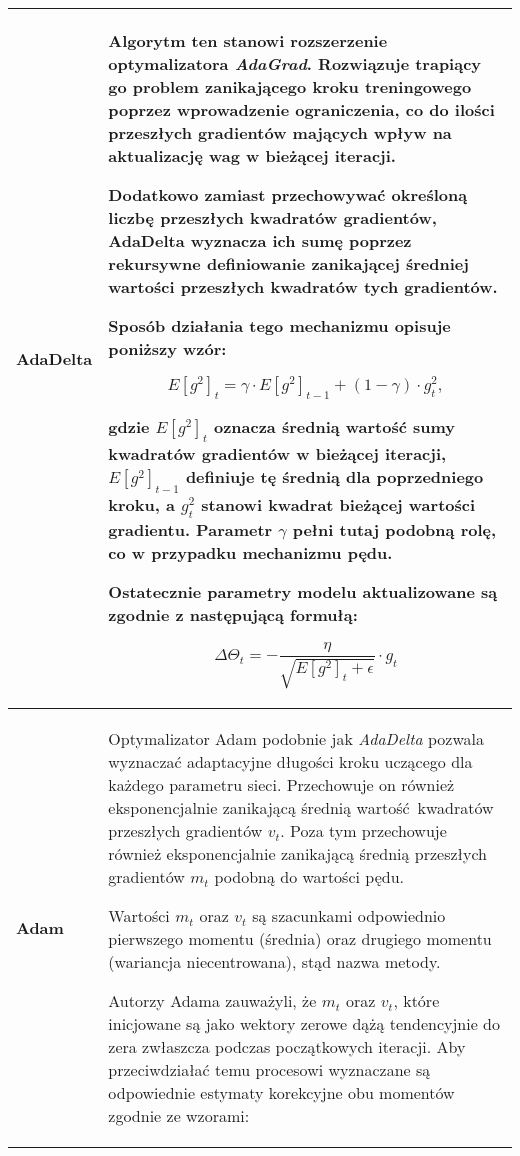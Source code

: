 \begin{enumerate}
\begin{small}
\begin{longtable}{ |m{3cm}|m{10cm}| }
     \hline
       \textbf{AdaDelta \cite{Adadelta}} &

       Algorytm ten stanowi rozszerzenie optymalizatora \textit{AdaGrad}. Rozwiązuje
       trapiący go problem zanikającego kroku treningowego poprzez wprowadzenie
       ograniczenia, co do ilości przeszłych gradientów mających wpływ na aktualizację
       wag w bieżącej iteracji.

       Dodatkowo zamiast przechowywać określoną liczbę przeszłych kwadratów gradientów,
       AdaDelta wyznacza ich sumę poprzez rekursywne definiowanie zanikającej
       średniej wartości przeszłych kwadratów tych gradientów.

       Sposób działania tego mechanizmu opisuje poniższy wzór:

       \[E[g^2]_t = \gamma \cdot E[g^2]_{t-1} + (1 - \gamma) \cdot g^2_t,\]

       gdzie $E[g^2]_t$ oznacza średnią wartość sumy kwadratów gradientów w bieżącej
       iteracji, $E[g^2]_{t-1}$ definiuje tę średnią dla poprzedniego kroku, a
       $g^2_t$ stanowi kwadrat bieżącej wartości gradientu. Parametr $\gamma$
       pełni tutaj podobną rolę, co w przypadku mechanizmu pędu.

       Ostatecznie parametry modelu aktualizowane są zgodnie z następującą formułą:

       \[\Delta \Theta_t = -\frac{\eta}{\sqrt{E[g^2]_t + \epsilon}} \cdot g_t\] \\

     \hline
       \textbf{Adam \cite{Adam}} &

       Optymalizator Adam podobnie jak \textit{AdaDelta} pozwala wyznaczać adaptacyjne długości
       kroku uczącego dla każdego parametru sieci. Przechowuje on również
       eksponencjalnie zanikającą średnią wartość kwadratów przeszłych gradientów $v_t$.
       Poza tym przechowuje również eksponencjalnie zanikającą średnią
       przeszłych gradientów $m_t$ podobną do wartości pędu.

       Wartości $m_t$ oraz $v_t$ są szacunkami odpowiednio pierwszego momentu
       (średnia) oraz drugiego momentu (wariancja niecentrowana), stąd nazwa metody.

       Autorzy Adama zauważyli, że $m_t$ oraz $v_t$, które inicjowane są jako
       wektory zerowe dążą tendencyjnie do zera zwłaszcza podczas początkowych
       iteracji. Aby przeciwdziałać temu procesowi wyznaczane są odpowiednie
       estymaty korekcyjne obu momentów zgodnie ze wzorami:


\end{longtable}
\end{small}
\end{enumerate}

